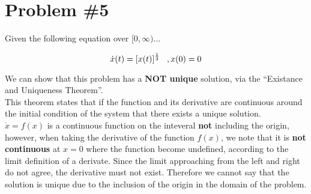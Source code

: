 \section*{Problem \#5}

Given the following equation over $[0, \infty)$...

$$
\dot{x}(t) = [x(t)]^{\frac{1}{3}} \hspace{.3cm}, x(0) =0\\
$$

\noindent We can show that this problem has a \textbf{NOT unique} solution, via the ``Existance and Uniqueness Theorem''. \\

\noindent This theorem states that if the function and its derivative are continuous around the initial condition of the system that there exists a unique solution. \\

\noindent $\dot{x} = f(x)$ is a continuous function on the inteveral \textbf{not} including the origin, however, when taking the derivative of the function $f(x)$, we note that it is \textbf{not continuous} at $x=0$ where the function become undefined, according to the limit definition of a derivate. Since the limit approaching from the left and right do not agree, the derivative must not exist. Therefore we cannot say that the solution is unique due to the inclusion of the origin in the domain of the problem.
